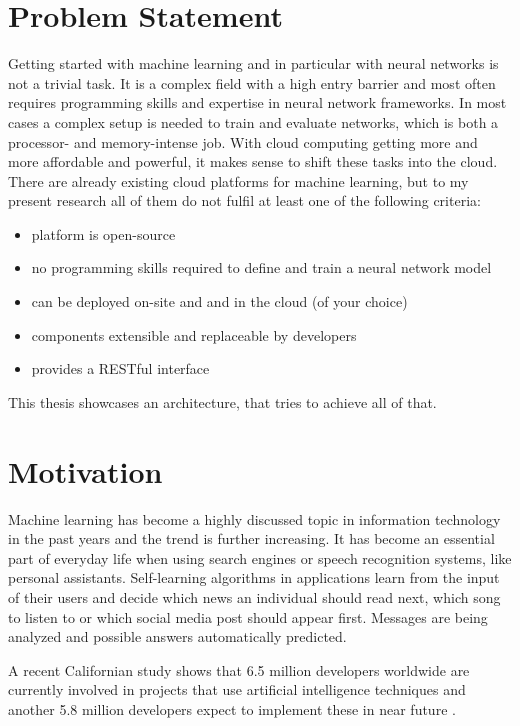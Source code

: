 \section{Problem Statement}\label{problem-statement}

Getting started with machine learning and in particular with neural
networks is not a trivial task. It is a complex field with a high entry
barrier and most often requires programming skills and expertise in
neural network frameworks. In most cases a complex setup is needed to
train and evaluate networks, which is both a processor- and
memory-intense job. With cloud computing getting more and more
affordable and powerful, it makes sense to shift these tasks into the
cloud. There are already existing cloud platforms for machine learning,
but to my present research all of them do not fulfil at least one of the
following criteria:

\begin{itemize}
\tightlist
\item
  platform is open-source
\item
  no programming skills required to define and train a neural network
  model
\item
  can be deployed on-site and and in the cloud (of your choice)
\item
  components extensible and replaceable by developers
\item
  provides a RESTful interface
\end{itemize}

This thesis showcases an architecture, that tries to achieve all of
that.

\section{Motivation}\label{motivation}

Machine learning has become a highly discussed topic in information
technology in the past years and the trend is further increasing. It has
become an essential part of everyday life when using search engines or
speech recognition systems, like personal assistants. Self-learning
algorithms in applications learn from the input of their users and
decide which news an individual should read next, which song to listen
to or which social media post should appear first. Messages are being
analyzed and possible answers automatically predicted.

A recent Californian study shows that 6.5 million developers worldwide
are currently involved in projects that use artificial intelligence
techniques and another 5.8 million developers expect to implement these
in near future \cite{evans}.

